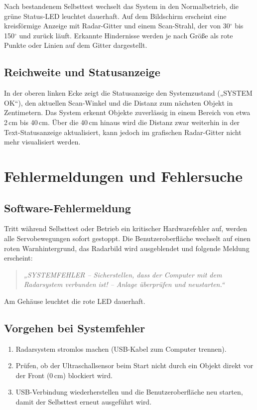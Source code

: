 \documentclass[a4paper,11pt]{article}
\begin{document}
Nach bestandenem Selbsttest wechselt das System in den Normalbetrieb, die grüne Status-LED leuchtet dauerhaft. 
Auf dem Bildschirm erscheint eine kreisförmige Anzeige mit Radar-Gitter und einem Scan-Strahl, der von 30\(^\circ\) bis 150\(^\circ\) und zurück läuft. 
Erkannte Hindernisse werden je nach Größe als rote Punkte oder Linien auf dem Gitter dargestellt. 

\subsection{Reichweite und Statusanzeige}

In der oberen linken Ecke zeigt die Statusanzeige den Systemzustand („SYSTEM OK“), den aktuellen Scan-Winkel und die Distanz zum nächsten Objekt in Zentimetern. 
Das System erkennt Objekte zuverlässig in einem Bereich von etwa 2\,cm bis 40\,cm. Über die 40\,cm hinaus wird die Distanz zwar weiterhin in der Text-Statusanzeige aktualisiert, kann jedoch im grafischen Radar-Gitter nicht mehr visualisiert werden.

\section{Fehlermeldungen und Fehlersuche}

\subsection{Software-Fehlermeldung}

Tritt während Selbsttest oder Betrieb ein kritischer Hardwarefehler auf, werden alle Servobewegungen sofort gestoppt. 
Die Benutzeroberfläche wechselt auf einen roten Warnhintergrund, das Radarbild wird ausgeblendet und folgende Meldung erscheint: 

\begin{quote}
	\textit{„SYSTEMFEHLER – Sicherstellen, dass der Computer mit dem Radarsystem verbunden ist! – Anlage überprüfen und neustarten.“}
\end{quote}

Am Gehäuse leuchtet die rote LED dauerhaft. 

\subsection{Vorgehen bei Systemfehler}

\begin{enumerate}
	\item Radarsystem stromlos machen (USB-Kabel zum Computer trennen). 
	\item Prüfen, ob der Ultraschallsensor beim Start nicht durch ein Objekt direkt vor der Front (0\,cm) blockiert wird. 
	\item USB-Verbindung wiederherstellen und die Benutzeroberfläche neu starten, damit der Selbsttest erneut ausgeführt wird. 
\end{enumerate}
\end{document}
